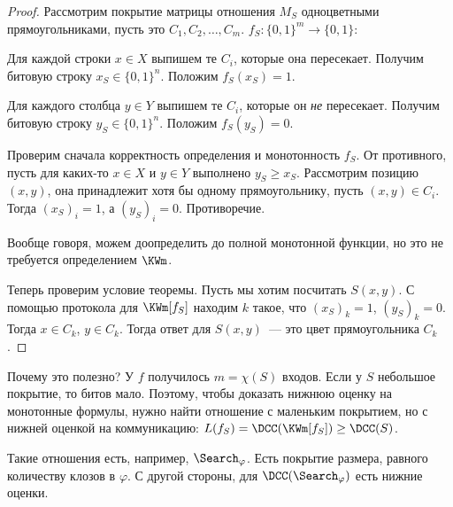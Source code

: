 \begin{proof}
    Рассмотрим покрытие матрицы отношения $M_S$ одноцветными прямоугольниками, пусть это $C_1, C_2,
    \ldots, C_m$. $f_S\colon \{0, 1\}^m \to \{0, 1\}$:

    Для каждой строки $x\in X$ выпишем те $C_i$, которые она пересекает. Получим битовую строку $x_S \in
    \{0, 1\}^n$. Положим $f_S(x_S) = 1$.

    Для каждого столбца $y\in Y$ выпишем те $C_i$, которые он \emph{не} пересекает. Получим битовую
    строку $y_S \in \{0, 1\}^n$. Положим $f_S(y_S) = 0$.

    Проверим сначала корректность определения и монотонность $f_S$. От противного, пусть для каких-то
    $x\in X$ и $y\in Y$ выполнено $y_S \geqslant x_S$. Рассмотрим позицию $(x, y)$, она принадлежит хотя
    бы одному прямоугольнику, пусть $(x, y)\in C_i$. Тогда $(x_S)_i = 1$, а $(y_S)_i = 0$. Противоречие.

    Вообще говоря, можем доопределить до полной монотонной функции, но это не требуется определением
    $\KWm$.

    Теперь проверим условие теоремы. Пусть мы хотим посчитать $S(x, y)$. С помощью протокола для
    $\KWm[f_S]$ находим $k$ такое, что $(x_S)_k = 1$, $(y_S)_k = 0$. Тогда $x\in C_k$, $y\in
    C_k$. Тогда ответ для $S(x, y)$~--- это цвет прямоугольника $C_k$.

\end{proof}

Почему это полезно? У $f$ получилось $m = \chi(S)$ входов. Если у $S$ небольшое покрытие, то битов
мало. Поэтому, чтобы доказать нижнюю оценку на монотонные формулы, нужно найти отношение с маленьким
покрытием, но с нижней оценкой на коммуникацию: $L(f_S) = \DCC(\KWm[f_S]) \ge \DCC(S)$. 

Такие отношения есть, например, $\Search_{\varphi}$. Есть покрытие размера, равного количеству клозов в
$\varphi$. С другой стороны, для $\DCC(\Search_{\varphi})$ есть нижние оценки.